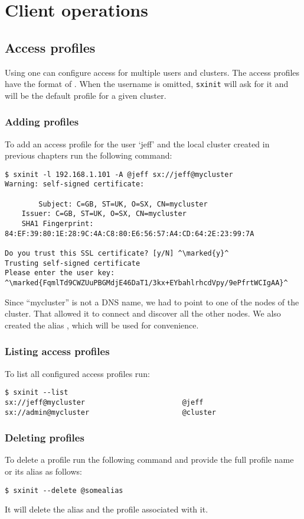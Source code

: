 \chapter{Client operations}

\section{Access profiles}
\label{sec:profiles}
Using  one can configure access for multiple users
and clusters. The access profiles have the format of
. When the username is omitted,
\verb+sxinit+ will ask for it and  will
be the default profile for a given cluster.

\subsection{Adding profiles}
To add an access profile for the user `jeff' and the local cluster
created in previous chapters run the following command:
\begin{lstlisting}
$ sxinit -l 192.168.1.101 -A @jeff sx://jeff@mycluster
Warning: self-signed certificate:

        Subject: C=GB, ST=UK, O=SX, CN=mycluster
	Issuer: C=GB, ST=UK, O=SX, CN=mycluster
	SHA1 Fingerprint: 84:EF:39:80:1E:28:9C:4A:C8:80:E6:56:57:A4:CD:64:2E:23:99:7A

Do you trust this SSL certificate? [y/N] ^\marked{y}^
Trusting self-signed certificate
Please enter the user key: ^\marked{FqmlTd9CWZUuPBGMdjE46DaT1/3kx+EYbahlrhcdVpy/9ePfrtWCIgAA}^
\end{lstlisting}
Since ``mycluster'' is not a DNS name, we had to point  
to one of the nodes of the cluster. That allowed it to connect and
discover all the other nodes. We also created the alias ,
which will be used for convenience.

\subsection{Listing access profiles}
To list all configured access profiles run:
\begin{lstlisting}
$ sxinit --list
sx://jeff@mycluster                       @jeff
sx://admin@mycluster                      @cluster
\end{lstlisting}

\subsection{Deleting profiles}
To delete a profile run the following command and provide the full
profile name or its alias as follows:
\begin{lstlisting}
$ sxinit --delete @somealias
\end{lstlisting}
It will delete the alias  and the profile associated with
it.

